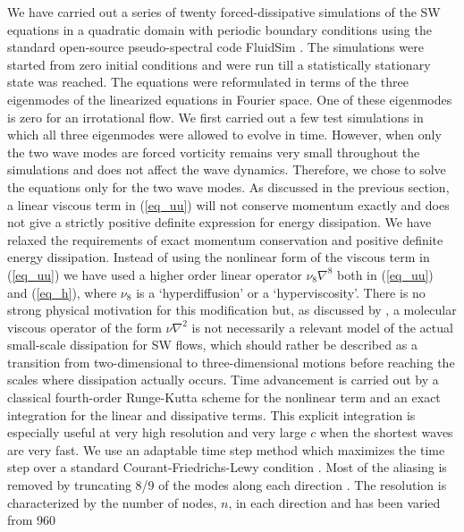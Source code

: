 \documentclass{jfm}
\begin{document}
We have carried out a series of twenty forced-dissipative simulations of the SW
equations in a quadratic domain with periodic boundary conditions using the
standard open-source pseudo-spectral code FluidSim \cite[]{fluiddyn, fluidfft,
fluidsim}.
%
The simulations were started from zero initial
conditions and were run till a statistically stationary state was reached. The
equations were reformulated in terms of the three eigenmodes of the linearized
equations in Fourier space. One of these eigenmodes is zero for an irrotational
flow. We first carried out a few test simulations in which all three eigenmodes
were allowed to evolve in time. However, when only the two wave modes are
forced vorticity remains very small throughout the simulations and does not
affect the wave dynamics. Therefore, we chose to solve the equations only for
the two wave modes. As discussed in the previous section, a linear viscous term
in (\ref{eq_uu}) will not conserve momentum exactly and does not give a
strictly positive definite expression for energy dissipation. We have relaxed
the requirements of exact momentum conservation and positive definite energy
dissipation. Instead of using the nonlinear form of the viscous term in
(\ref{eq_uu}) we have used a higher order linear operator $ \nu_8 \nabla^{8} $
both in (\ref{eq_uu}) and (\ref{eq_h}), where $ \nu_8 $ is a `hyperdiffusion'
or a `hyperviscosity'. There is no strong physical motivation for this
modification but, as discussed by \cite{FargeSadourny1989}, a molecular viscous
operator of the form $\nu \nabla^2 $ is not necessarily a relevant model of the
actual small-scale dissipation for SW flows, which should rather be described
as a transition from two-dimensional to three-dimensional motions before
reaching the scales where dissipation actually occurs.
%
Time advancement is carried out by a classical fourth-order Runge-Kutta scheme
for the nonlinear term and an exact integration for the linear and dissipative
terms. This explicit integration is especially useful at very high resolution
and very large $c$ when the shortest waves are very fast. We use an adaptable
time step method which maximizes the time step over a standard
Courant-Friedrichs-Lewy condition \cite[]{Lundbladh1999,
AugierChomazBillant2012}.
%
Most of the aliasing is removed by truncating 8/9 of the modes along each
direction \cite[for a detail discussion on the issues of the non-conservation
of the non-quadratic energy and the aliasing errors in the truncated one-layer
shallow water model, see][]{FargeSadourny1989}. The resolution is characterized
by the number of nodes, $n$, in each direction and has been varied from 960
\end{document}
